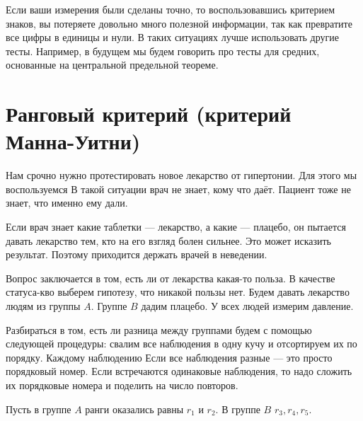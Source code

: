\documentclass[12pt, a4paper, oneside]{article}
\begin{document}
Если ваши измерения были сделаны точно, то воспользовавшись критерием знаков, вы потеряете довольно много полезной информации, так как превратите все цифры в единицы и нули. В таких ситуациях лучше использовать другие тесты. Например, в будущем мы будем говорить про тесты для средних, основанные на центральной предельной теореме.  

\section{Ранговый критерий (критерий Манна-Уитни)}

Нам срочно нужно протестировать новое лекарство от гипертонии. Для этого мы воспользуемся  В такой ситуации врач не знает, кому что даёт. Пациент тоже не знает, что именно ему дали. 

Если врач знает какие таблетки --- лекарство, а какие --- плацебо, он пытается давать лекарство тем, кто на его взгляд болен сильнее. Это может исказить результат. Поэтому приходится держать врачей в неведении. 

Вопрос заключается в том, есть ли от лекарства какая-то польза. В качестве статуса-кво выберем гипотезу, что никакой пользы нет. Будем давать лекарство людям из группы $A$. Группе $B$ дадим плацебо. У всех людей измерим давление. 

Разбираться в том, есть ли разница между группами будем с помощью следующей процедуры: свалим все наблюдения в одну кучу и отсортируем их по порядку. Каждому наблюдению  Если все наблюдения разные --- это просто порядковый номер. Если встречаются одинаковые наблюдения, то надо сложить их порядковые номера и поделить на число повторов. 

Пусть в группе $A$ ранги оказались равны $r_1$ и $r_2$. В группе $B$ $r_3, r_4, r_5$. 
\end{document}
